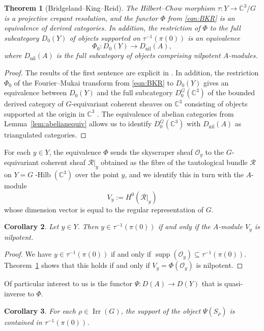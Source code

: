 \documentclass[11pt,reqno]{amsart}
\numberwithin{equation}{section}
\newtheorem{theorem}{Theorem}[section]
\newtheorem{corollary}[theorem]{Corollary}
\theoremstyle{definition}
\newcommand{\CC}{\ensuremath{\mathbb{C}}}
\newcommand{\Dnil}{D_{\operatorname{nil}}}
\newcommand{\ghilb}{\ensuremath{G}\operatorname{-Hilb}}
\newcommand{\0}{\operatorname{0}}
\newcommand{\Irr}{\operatorname{Irr}}
\newcommand{\supp}{\operatorname{supp}}
\begin{document}
\begin{theorem}[Bridgeland--King--Reid]
\label{thm:BKR}
The Hilbert--Chow morphism $\tau\colon Y\to \mathbb{C}^3/G$ is a projective crepant resolution, and the functor $\Phi$ from \eqref{eqn:BKR} is an equivalence of derived categories. In addition, the restriction of $\Phi$ to the full subcategory $D_{0}(Y)$ of objects supported on $\tau^{-1}(\pi(0))$ is an equivalence
 \[
 \Phi_0\colon D_0(Y)\longrightarrow \Dnil(A),
 \] where 
 $\Dnil(A)$ is the full subcategory of objects comprising nilpotent $A$-modules.
\end{theorem}
 \begin{proof}
 The results of the first sentence are explicit in \cite{BKR01}. In addition, the restriction $\Phi_0$ of the Fourier--Mukai transform from \eqref{eqn:BKR} to $D_0(Y)$ gives an equivalence between $D_0(Y)$ and the full subcategory $D^G_0(\mathbb{C}^3)$ of the bounded derived category of $G$-equivariant coherent sheaves on $\mathbb{C}^3$ consisting of objects supported at the origin in $\mathbb{C}^3$ \cite[Section~6, Step~7]{BKR01}. The equivalence of abelian categories from Lemma~\ref{lem:abelianequiv} allows us to identify $D^G_0(\mathbb{C}^3)$ with $\Dnil(A)$ as triangulated categories. 
 \end{proof}

  For each $y\in Y$, the equivalence $\Phi$ sends the skyscraper sheaf $\mathcal{O}_y$ to the $G$-equivariant coherent sheaf $\mathcal{R}\vert_y$ obtained as the fibre of the tautological bundle $\mathcal{R}$ on $Y=\ghilb(\CC^3)$ over the point $y$, and we identify this in turn with the $A$-module \[
  V_y:=H^0(\mathcal{R}\vert_y)
  \]
  whose dimension vector is equal to the regular representation of $G$.
 
\begin{corollary}
\label{cor:fibrenilpotent}
 Let $y\in Y$. Then $y\in \tau^{-1}(\pi(0))$ if and only if the $A$-module $V_y$ is nilpotent.
 \end{corollary}
 \begin{proof}
 We have $y\in \tau^{-1}(\pi(0))$ if and only if $\supp(\mathcal{O}_y)\subseteq \tau^{-1}(\pi(0))$. Theorem~\ref{thm:BKR} shows that this holds if and only if $V_y=\Phi(\mathcal{O}_y)$ is nilpotent.
 \end{proof}
 
 Of particular interest to us is the functor $\Psi\colon D(A)\rightarrow D(Y)$ that is quasi-inverse to $\Phi$.
 
\begin{corollary}
\label{cor:PsiSrhofibre}  For each $\rho\in \Irr(G)$, the support of the object $\Psi(S_\rho)$ is contained in $\tau^{-1}(\pi(0))$.
\end{corollary}
 
\end{document}
